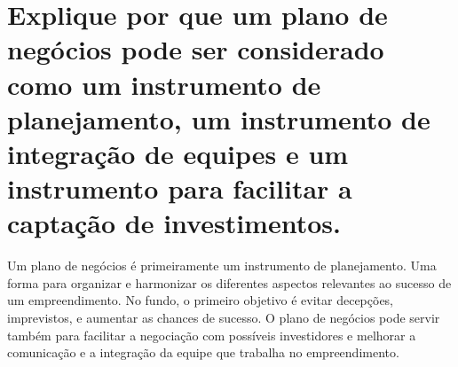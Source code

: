 \documentclass[a4paper,10pt]{article}
\begin{document}
\section{Explique por que um plano de negócios pode ser considerado como um instrumento de planejamento, um instrumento de integração de equipes e um instrumento para facilitar a captação de investimentos.}

Um plano de negócios é primeiramente um instrumento de planejamento. Uma forma para organizar e harmonizar os diferentes aspectos relevantes ao sucesso de um empreendimento. No fundo, o primeiro objetivo é evitar decepções, imprevistos, e aumentar as chances de sucesso. O plano de negócios pode servir também para facilitar a negociação com possíveis investidores e melhorar a comunicação e a integração da equipe que trabalha no empreendimento.
\end{document}
